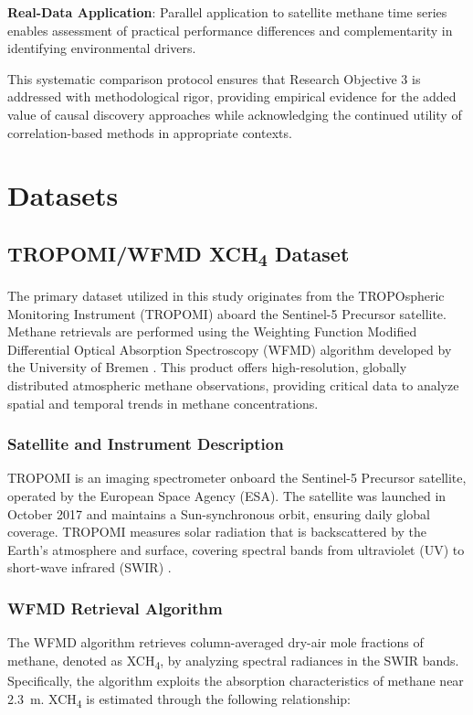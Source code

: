 \textbf{Real-Data Application}: Parallel application to satellite methane time series enables assessment of practical performance differences and complementarity in identifying environmental drivers.

This systematic comparison protocol ensures that Research Objective 3 is addressed with methodological rigor, providing empirical evidence for the added value of causal discovery approaches while acknowledging the continued utility of correlation-based methods in appropriate contexts.


\section{Datasets}
\label{sec:datasets}

\subsection{TROPOMI/WFMD \texorpdfstring{XCH\textsubscript{4}}{XCH4} Dataset}

The primary dataset utilized in this study originates from the TROPOspheric Monitoring Instrument (TROPOMI) aboard the Sentinel-5 Precursor satellite. Methane retrievals are performed using the Weighting Function Modified Differential Optical Absorption Spectroscopy (WFMD) algorithm developed by the University of Bremen \cite{Schneising2019, Schneising2023}. This product offers high-resolution, globally distributed atmospheric methane observations, providing critical data to analyze spatial and temporal trends in methane concentrations.

\subsubsection{Satellite and Instrument Description}
TROPOMI is an imaging spectrometer onboard the Sentinel-5 Precursor satellite, operated by the European Space Agency (ESA). The satellite was launched in October 2017 and maintains a Sun-synchronous orbit, ensuring daily global coverage. TROPOMI measures solar radiation that is backscattered by the Earth's atmosphere and surface, covering spectral bands from ultraviolet (UV) to short-wave infrared (SWIR) \cite{Veefkind2012}.

\subsubsection{WFMD Retrieval Algorithm}
The WFMD algorithm retrieves column-averaged dry-air mole fractions of methane, denoted as XCH\textsubscript{4}, by analyzing spectral radiances in the SWIR bands. Specifically, the algorithm exploits the absorption characteristics of methane near 2.3~\textmu m. XCH\textsubscript{4} is estimated through the following relationship:

